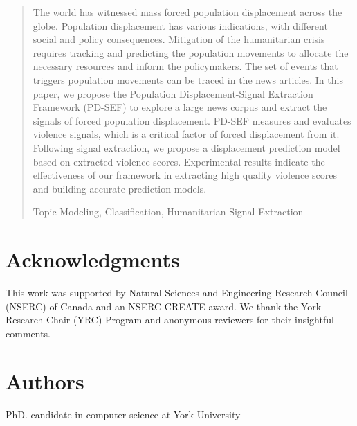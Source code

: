 \documentclass[11pt,letterpaper]{llncs}
\newcommand{\keywords}[1]{\par\addvspace\baselineskip
\noindent\keywordname\enspace\ignorespaces#1}
\begin{document}
\maketitle

\thispagestyle{firstpage}


\begin{abstract}
The world has witnessed mass forced population displacement across the globe. Population displacement has various indications, with different social and policy consequences.  Mitigation of the humanitarian crisis requires tracking and predicting the population movements to allocate the necessary resources and inform the policymakers. The set of events that triggers population movements can be traced in the news articles. In this paper, we propose the Population Displacement-Signal Extraction Framework (PD-SEF) to explore a large news corpus and extract the signals of forced population displacement. PD-SEF measures and evaluates violence signals, which is a critical factor of forced displacement from it. Following signal extraction, we propose a displacement prediction model based on extracted violence scores. Experimental results indicate the effectiveness of our framework in extracting high quality violence scores and building accurate prediction models. 
\keywords{Topic Modeling, Classification, Humanitarian Signal Extraction}
\end{abstract}




\section*{Acknowledgments} This work was supported by Natural Sciences and Engineering Research Council (NSERC) of Canada and an NSERC CREATE award. We thank the York Research Chair (YRC) Program and anonymous reviewers for their insightful comments.
 






\vspace{2cm}

\section*{Authors}
 PhD. candidate in computer science at York University \\
\end{document}
